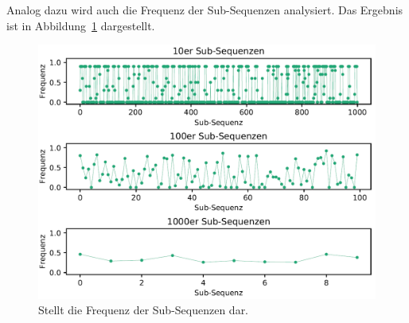\newpage
Analog dazu wird auch die Frequenz der Sub-Sequenzen analysiert. Das Ergebnis ist in Abbildung~\ref{fig:example_subsequence_frequences} dargestellt.

\begin{figure}[H]
	\includegraphics[width=\linewidth]{pythonImplementation/images/example_subsequences_frequences.PNG}
	\caption[Darstellung der Sub-Sequenzen im Bezug auf die Frequenz]{Stellt die Frequenz der Sub-Sequenzen dar\footnotemark.}
	\label{fig:example_subsequence_frequences}
\end{figure}




